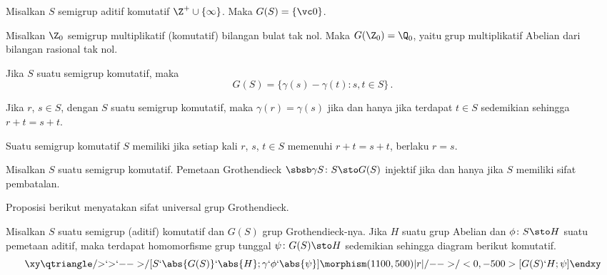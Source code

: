 \begin{exam}\label{0062127} Misalkan $S$ semigrup aditif komutatif $\Z^+ \cup \{\infty\}$. Maka $G(S) = \{\vc 0\}$.
\end{exam}

\begin{exam}\label{0062128} Misalkan $\Z_0$ semigrup multiplikatif (komutatif) bilangan bulat tak nol.
Maka $G(\Z_0) = \Q_0$, yaitu grup multiplikatif Abelian dari bilangan rasional tak
nol.
\end{exam}

\begin{prop}\label{0062141} Jika $S$ suatu semigrup komutatif, maka
   \[ G(S) = \{\gamma(s) - \gamma(t)\colon s,t \in S\}\,. \]
\end{prop}

\begin{prop}\label{0062142} Jika $r$, $s \in S$, dengan $S$ suatu semigrup komutatif, maka $\gamma(r) = \gamma(s)$ jika dan hanya jika
terdapat $t \in S$ sedemikian sehingga $r + t = s + t$.
\end{prop}

\begin{defn} Suatu semigrup komutatif $S$ memiliki
 jika setiap kali $r$, $s$, $t \in S$ memenuhi $r + t = s + t$, berlaku $r = s$.
\end{defn}

\begin{cor}\label{0062144} Misalkan $S$ suatu semigrup komutatif. Pemetaan Grothendieck $\sbsb\gamma S\colon S \sto G(S)$ injektif
jika dan hanya jika $S$ memiliki sifat pembatalan.
\end{cor}

Proposisi berikut menyatakan sifat universal grup Grothendieck.

\begin{prop}\label{0062151} Misalkan $S$ suatu semigrup (aditif) komutatif dan $G(S)$ grup Grothendieck-nya.
Jika $H$ suatu grup Abelian dan $\phi\colon S \sto H$ suatu pemetaan aditif, maka terdapat
homomorfisme grup tunggal $\psi\colon G(S) \sto H$ sedemikian sehingga diagram berikut
komutatif.
 \begin{equation}\label{0062151i}
   \xy
     \qtriangle/{>}`{>}`{-->}/[S`\abs{G(S)}`\abs{H};\gamma`\phi`\abs{\psi}]
     \morphism(1100,500)|r|/{-->}/<0,-500>[G(S)`H;\psi]
   \endxy
 \end{equation}
\end{prop}

